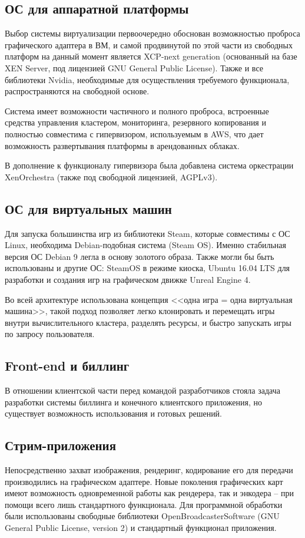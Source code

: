 \documentclass[10pt, a5paper]{article}
\begin{document}
\subsection*{ОС для аппаратной платформы}
Выбор системы виртуализации первоочередно обоснован возможностью проброса графического адаптера в ВМ, и самой продвинутой по этой части из свободных платформ на данный момент является XCP-next generation (основанный на базе XEN Server, под лицензией GNU General Public License). Также и все библиотеки Nvidia, необходимые для осуществления требуемого функционала, распространяются на свободной основе.

Система имеет возможности частичного и полного проброса, встроенные средства управления кластером, мониторинга, резервного копирования и полностью совместима с гипервизором, используемым в AWS, что дает возможность развертывания платформы в арендованных облаках.

В дополнение к функционалу гипервизора была добавлена система оркестрации XenOrchestra (также под свободной лицензией, AGPLv3).

\subsection*{ОС для виртуальных машин}
Для запуска большинства игр из библиотеки Steam, которые совместимы с ОС Linux, необходима Debian-подобная система (Steam OS). Именно стабильная версия ОС Debian 9 легла в основу золотого образа. Также могли бы быть использованы и другие ОС: SteamOS в режиме киоска, Ubuntu 16.04 LTS для разработки и создания игр на графическом движке Unreal Engine 4.

Во всей архитектуре использована концепция <<одна игра = одна виртуальная машина>>, такой подход позволяет легко клонировать и перемещать игры внутри вычислительного кластера, разделять ресурсы, и быстро запускать игры по запросу пользователя.

\subsection*{Front-end и биллинг} 
В отношении клиентской части перед командой разработчиков стояла задача разработки системы биллинга и конечного клиентского приложения, но существует возможность использования и готовых решений.
\subsection*{Стрим-приложения}
Непосредственно захват изображения, рендеринг, кодирование его для передачи производились на графическом адаптере. Новые поколения графических карт имеют возможность одновременной работы как рендерера, так и энкодера – при помощи всего лишь стандартного функционала. Для программной обработки были использованы свободные библиотеки OpenBroadcasterSoftware (GNU General Public License, version 2) и стандартный функционал приложения.
\end{document}
